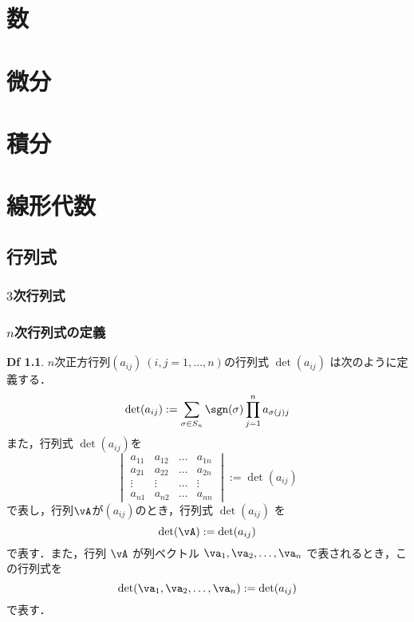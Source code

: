 \documentclass{book}　%
\theoremstyle{definition}
\newtheorem{dfn}[thm]{Df}
\newcommand{\edfn}{:=}
\begin{document}
	\tableofcontents
	\part{数}
	\part{微分}
	\part{積分}
	\part{線形代数}
		\chapter{行列式}
			\section{$3$次行列式}
			\section{$n$次行列式の定義}
				\begin{dfn} $n$次正方行列$(a_{i j}) \ (i,j = 1 ,\dots,n)$の行列式 $\det(a_{ij})$ は次のように定義する．
					\begin{equation}
						\det(a_{i j}) \edfn \sum_{\sigma \in S_n} \sgn(\sigma) \prod_{j=1}^{n} a_{\sigma(j) j}
					\end{equation}
					また，行列式 $\det(a_{i j})$を
					\begin{equation}
						\begin{vmatrix}
							a_{1 1} & a_{1 2} & \dots & a_{1 n} \\
							a_{2 1} & a_{2 2} & \dots & a_{2 n} \\
							\vdots & \vdots & \dots & \vdots \\
							a_{n 1} & a_{n 2} & \dots & a_{n n}
						\end{vmatrix}
						\edfn \det(a_{i j})
					\end{equation}
					で表し，行列$\vA$が$(a_{i j})$のとき，行列式 $\det(a_{i j})$ を
					\begin{equation}
						\det(\vA) \edfn \det(a_{i j})
					\end{equation}
					で表す．また，行列 $\vA$ が列ベクトル $\va_1, \va_2, \dots, \va_n$ で表されるとき，この行列式を
					\begin{equation}
						\det(\va_1,\va_2, \dots, \va_n) \edfn \det(a_{i j})
					\end{equation}
					で表す．
				\end{dfn}
\end{document}
